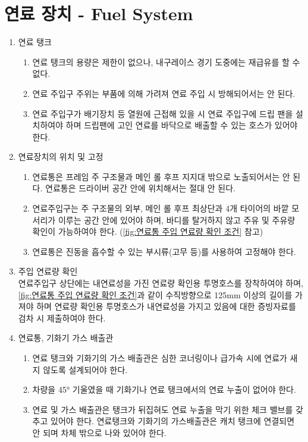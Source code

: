 \documentclass[final,a4paper,10pt]{report}
\begin{document}
\section{연료 장치 - Fuel System} \label{section:연료장치}
\begin{enumerate}
  \item 연료 탱크
    \begin{enumerate}
      \item 연료 탱크의 용량은 제한이 없으나, 내구레이스 경기 도중에는 재급유를 할 수 없다.
      \item 연료 주입구 주위는 부품에 의해 가려져 연료 주입 시 방해되어서는 안 된다.
      \item 연료 주입구가 배기장치 등 열원에 근접해 있을 시 연료 주입구에 드립 팬을 설치하여야 하며 드립팬에 고인 연료를 바닥으로 배출할 수 있는 호스가 있어야 한다.
    \end{enumerate}
    
  \item 연료장치의 위치 및 고정
    \begin{enumerate}
      \item 연료통은 프레임 주 구조물과 메인 롤 후프 지지대 밖으로 노출되어서는 안 된다. 연료통은 드라이버 공간 안에 위치해서는 절대 안 된다.
      \item 연료주입구는 주 구조물의 외부, 메인 롤 후프 최상단과 4개 타이어의 바깥 모서리가 이루는 공간 안에 있어야 하며, 바디를 탈거하지 않고 주유 및 주유량 확인이 가능하여야 한다. (\cref{fig:연료통 주입 연료량 확인 조건} 참고)
      \item 연료통은 진동을 흡수할 수 있는 부시류(고무 등)를 사용하여 고정해야 한다.
    \end{enumerate}
    
  \item 주입 연료량 확인\\
    연료주입구 상단에는 내연료성을 가진 연료량 확인용 투명호스를 장착하여야 하며, \cref{fig:연료통 주입 연료량 확인 조건}과 같이 수직방향으로 125mm 이상의 길이를 가져야 하며 연료량 확인용 투명호스가 내연료성을 가지고 있음에 대한 증빙자료를 검차 시 제출하여야 한다.


  \item 연료통, 기화기 가스 배출관
    \begin{enumerate}
      \item 연료 탱크와 기화기의 가스 배출관은 심한 코너링이나 급가속 시에 연료가 새지 않도록 설계되어야 한다.
      \item 차량을 45° 기울였을 때 기화기나 연료 탱크에서의 연료 누출이 없어야 한다.
      \item 연료 및 가스 배출관은 탱크가 뒤집혀도 연료 누출을 막기 위한 체크 밸브를 갖추고 있어야 한다. 연료탱크와 기화기의 가스배출관은 캐치 탱크에 연결되면 안 되며 차체 밖으로 나와 있어야 한다.
    \end{enumerate}
    

\end{enumerate}
\end{document}
